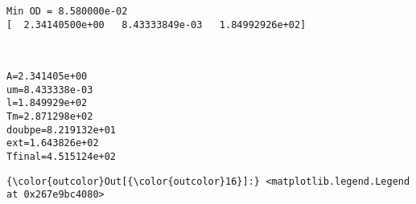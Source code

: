 \documentclass[11pt]{article}
\begin{document}
    \begin{Verbatim}[commandchars=\\\{\}]
Min OD = 8.580000e-02
[  2.34140500e+00   8.43333849e-03   1.84992926e+02]

    \end{Verbatim}

    \begin{center}
    \end{center}
    { \hspace*{\fill} \\}
    
    \begin{Verbatim}[commandchars=\\\{\}]
A=2.341405e+00
um=8.433338e-03
l=1.849929e+02
Tm=2.871298e+02
doubpe=8.219132e+01
ext=1.643826e+02
Tfinal=4.515124e+02

    \end{Verbatim}

            \begin{Verbatim}[commandchars=\\\{\}]
{\color{outcolor}Out[{\color{outcolor}16}]:} <matplotlib.legend.Legend at 0x267e9bc4080>
\end{Verbatim}
        
    \begin{center}
    \end{center}
    { \hspace*{\fill} \\}
    
    \begin{center}
    \end{center}
    { \hspace*{\fill} \\}
    
\end{document}
